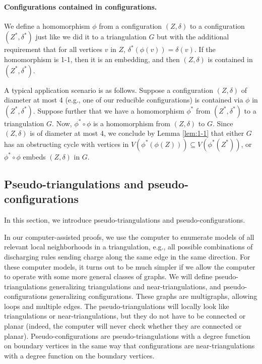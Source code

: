 \documentclass[10pt,a4paper]{article}
\begin{document}
\paragraph{Configurations contained in configurations.}
We define a homomorphism $\phi$ from a configuration $(Z,\delta)$ 
to a configuration $(Z^*,\delta^*)$ just like we did it to a triangulation $G$ but with the additional requirement that for all vertices $v$ in $Z$, $\delta^*(\phi(v))=\delta(v)$.  If the homomorphism is 1-1, then it is an embedding, and then $(Z,\delta)$ is contained in $(Z^*,\delta^*)$.  

A typical application scenario is as follows.
Suppose a configuration $(Z,\delta)$ of diameter at most 4 (e.g., one of our reducible configurations) is contained via $\phi$ in $(Z^*,\delta^*)$. Suppose further that we have a homomorphism $\phi^*$ from $(Z^*,\delta^*)$ to a triangulation $G$. 
Now, $\phi^*\circ \phi$ is a homomorphism from $(Z,\delta)$ to $G$.
Since $(Z,\delta)$ is of diameter at most 4, we conclude by Lemma \ref{lem:1-1} that either $G$ has an obstructing cycle with vertices in 
$V(\phi^*(\phi(Z)))\subseteq V(\phi^*(Z^*))$, 
or $\phi^*\circ\phi$ embeds $(Z,\delta)$ in $G$.


\subsection{Pseudo-triangulations and pseudo-configurations}
\label{sect:pseodo-config}

In this section, we introduce pseudo-triangulations and pseudo-configurations. 

In our computer-assisted proofs, we use the computer to enumerate models
of all relevant local neighborhoods in a 
triangulation, e.g., all possible combinations of discharging rules sending charge along the same edge in the same direction. 
For these computer models, it turns out to be much simpler
if we allow the computer to operate with some more general classes of graphs. We will
define pseudo-triangulations 
generalizing triangulations and near-triangulations, and pseudo-configurations generalizing configurations.
These graphs are multigraphs, allowing loops and multiple edges. The pseudo-triangulations 
will locally look like triangulations or near-triangulations, but
they do not have to be connected or planar (indeed, the computer will never check whether they are connected or planar). Pseudo-configurations are pseudo-triangulations with a degree function on boundary vertices in the same
way that configurations are near-triangulations with a degree function on the boundary vertices.
\end{document}

